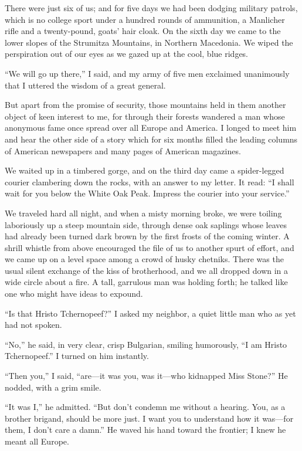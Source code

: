 \documentclass[a5paper,12pt]{book}
\begin{document}
There were just six of us; and for five days we had been dodging military patrols, which is no college sport under a hundred rounds of ammunition, a Manlicher rifle and a twenty-pound, goats’ hair cloak. On the sixth day we came to the lower slopes of the Strumitza Mountains, in Northern Macedonia. We wiped the perspiration out of our eyes as we gazed up at the cool, blue ridges.

“We will go up there,” I said, and my army of five men exclaimed unanimously that I uttered the wisdom of a great general.

But apart from the promise of security, those mountains held in them another object of keen interest to me, for through their forests wandered a man whose anonymous fame once spread over all Europe and America. I longed to meet him and hear the other side of a story which for six months filled the leading columns of American newspapers and many pages of American magazines.

We waited up in a timbered gorge, and on the third day came a spider-legged courier clambering down the rocks, with an answer to my letter. It read: “I shall wait for you below the White Oak Peak. Impress the courier into your service.”

We traveled hard all night, and when a misty morning broke, we were toiling laboriously up a steep mountain side, through dense oak saplings whose leaves had already been turned dark brown by the first frosts of the coming winter. A shrill whistle from above encouraged the file of us to another spurt of effort, and we came up on a level space among a crowd of husky chetniks. There was the usual silent exchange of the kiss of brotherhood, and we all dropped down in a wide circle about a fire. A tall, garrulous man was holding forth; he talked like one who might have ideas to expound.

“Is that Hristo Tchernopeef?” I asked my neighbor, a quiet little man who as yet had not spoken.

“No,” he said, in very clear, crisp Bulgarian, smiling humorously, “I am Hristo Tchernopeef.” I turned on him instantly.

“Then you,” I said, “are—it was you, was it—who kidnapped Miss Stone?” He nodded, with a grim smile.

“It was I,” he admitted. “But don’t condemn me without a hearing. You, as a brother brigand, should be more just. I want you to understand how it was—for them, I don’t care a damn.” He waved his hand toward the frontier; I knew he meant all Europe.
\end{document}
